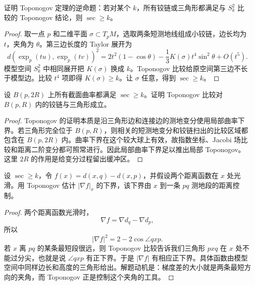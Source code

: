\documentclass[11pt,a4paper,openany]{ctexbook}
\numberwithin{equation}{chapter}
\begin{document}
\begin{exercise}
证明 Toponogov 定理的逆命题：若对某个 \(k\)，所有铰链或三角形都满足与 \(S_k^2\) 比较的 Toponogov 结论，则 \(\sec\ge k\)。
\end{exercise}
\begin{proof}
取一点 \(p\) 和二维平面 \(\sigma\subset T_pM\)，选取两条短测地线组成小铰链，边长均为 \(t\)，夹角为 \(\theta\)。第三边长度的 Taylor 展开为
\[
d(\exp_p(tu),\exp_p(tv))^2
=2t^2(1-\cos\theta)-\frac13 K(\sigma)t^4\sin^2\theta+O(t^5).
\]
模型空间 \(S_k^2\) 中相同展开把 \(K(\sigma)\) 换成 \(k\)。Toponogov 比较给原空间第三边不长于模型边。比较 \(t^4\) 项即得 \(K(\sigma)\ge k\)。让 \(\sigma\) 任意，得到 \(\sec\ge k\)。
\end{proof}

\begin{exercise}
设 \(B(p,2R)\) 上所有截面曲率都满足 \(\sec\ge k\)。证明 Toponogov 比较对 \(B(p,R)\) 内的铰链与三角形成立。
\end{exercise}
\begin{proof}
Toponogov 的证明本质是沿三角形边和连接边的测地变分使用局部曲率下界。若三角形完全位于 \(B(p,R)\)，则相关的短测地变分和铰链扫出的比较区域都包含在 \(B(p,2R)\) 内。曲率下界在这个较大球上有效，故指数坐标、Jacobi 场比较和距离二阶变分都可照常进行。因此局部曲率下界足以推出局部 Toponogov。这里 \(2R\) 的作用是给变分过程留出缓冲区。
\end{proof}

\begin{exercise}
设 \(\sec\ge k\)，令 \(f(x)=d(x,q)-d(x,p)\)，并假设两个距离函数在 \(x\) 处光滑。用 Toponogov 估计 \(|\nabla f|_x\) 的下界，该下界由 \(x\) 到一条 \(pq\) 测地段的距离控制。
\end{exercise}
\begin{proof}
两个距离函数光滑时，
\[
\nabla f=\nabla d_q-\nabla d_p,
\]
所以
\[
|\nabla f|^2=2-2\cos\angle qxp.
\]
若 \(x\) 离 \(pq\) 的某条最短段很远，则 Toponogov 比较告诉我们三角形 \(pxq\) 在 \(x\) 处不能过分尖，也就是说 \(\angle qxp\) 有正下界。于是 \(|\nabla f|\) 有相应正下界。具体函数由模型空间中同样边长和高度的三角形给出。解题动机是：梯度差的大小就是两条最短方向的夹角，而 Toponogov 正是控制这个夹角的工具。
\end{proof}
\end{document}
